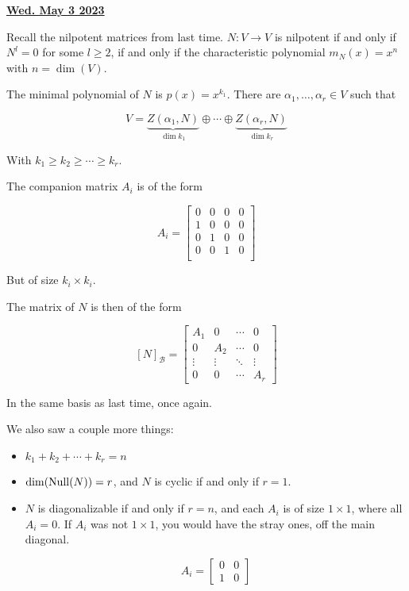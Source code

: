\documentclass[12pt]{article}
\renewcommand{\date}[1]{\underline{\bf #1}}
\def\B{\mathcal B}
\begin{document}
  \date{Wed. May 3 2023}


  Recall the nilpotent matrices from last time. $N: V \to V$ is nilpotent if and
  only if $N^l = 0$ for some $l \ge 2$, if and only if the characteristic
  polynomial $m_N(x) = x^n$ with $n = \dim(V)$.

  The minimal polynomial of $N$ is $p(x) = x^{k_1}$. There are $\alpha_1, \dots,
  \alpha_r \in V$ such that

  \[
    V = \underbrace{Z(\alpha_1, N)}_{\dim k_1} \oplus \cdots \oplus
    \underbrace{Z(\alpha_r, N)}_{\dim k_r}
  \]

  With $k_1 \ge k_2 \ge \cdots \ge k_r$.

  The companion matrix $A_i$ is of the form

  \[
    A_i = \begin{bmatrix}
      0 & 0 & 0 & 0 \\
      1 & 0 & 0 & 0 \\
      0 & 1 & 0 & 0 \\
      0 & 0 & 1 & 0 \\
    \end{bmatrix}
  \]

  But of size $k_i \times k_i$.

  The matrix of $N$ is then of the form

  \[
    [N]_\B = \begin{bmatrix}
      A_1 & 0 & \cdots & 0 \\
      0 & A_2 & \cdots & 0 \\
      \vdots & \vdots & \ddots & \vdots \\
      0 & 0 & \cdots & A_r
    \end{bmatrix}
  \]

  In the same basis as last time, once again.

  We also saw a couple more things:

  \begin{itemize}
    \item $k_1 + k_2 + \cdots + k_r = n$
    \item $\dim(\mathrm{Null}(N)) = r$, and $N$ is cyclic if and only if $r = 1$.
    \item $N$ is diagonalizable if and only if $r = n$, and each $A_i$ is of
      size $1 \times 1$, where all $A_i = 0$. If $A_i$ was not $1 \times 1$, you
      would have the stray ones, off the main diagonal.

      \[
        A_i = \begin{bmatrix}
          0 & 0 \\
          1 & 0
        \end{bmatrix}
      \]
  \end{itemize}
\end{document}
